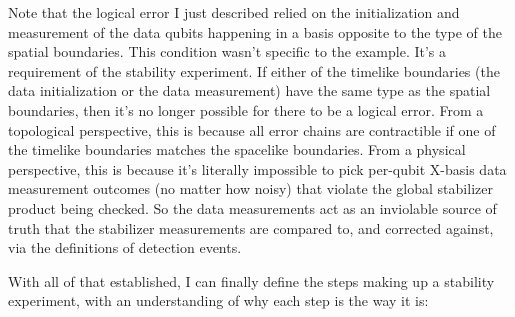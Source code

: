 \documentclass[onecolumn,unpublished,a4paper]{quantumarticle}
\theoremstyle{definition}
\theoremstyle{definition}
\theoremstyle{definition}
\begin{document}
Note that the logical error I just described relied on the initialization and measurement of the data qubits happening in a basis opposite to the type of the spatial boundaries.
This condition wasn't specific to the example.
It's a requirement of the stability experiment.
If either of the timelike boundaries (the data initialization or the data measurement) have the same type as the spatial boundaries, then it's no longer possible for there to be a logical error.
From a topological perspective, this is because all error chains are contractible if one of the timelike boundaries matches the spacelike boundaries.
From a physical perspective, this is because it's literally impossible to pick per-qubit X-basis data measurement outcomes (no matter how noisy) that violate the global stabilizer product being checked.
So the data measurements act as an inviolable source of truth that the stabilizer measurements are compared to, and corrected against, via the definitions of detection events.

With all of that established, I can finally define the steps making up a stability experiment, with an understanding of why each step is the way it is:
\end{document}
